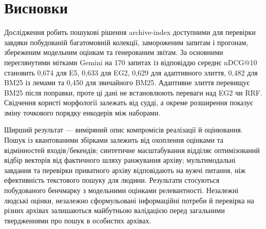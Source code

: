 \section{Висновки}\label{sec:conclusion}

Дослідження робить пошукові рішення archive-index доступними для перевірки завдяки побудованій багатомовній колекції, замороженим запитам і прогонам, збереженим модельним оцінкам та генерованим звітам. За основними переглянутими мітками Gemini на 170 запитах із відповіддю середнє nDCG@10 становить 0,674 для E5, 0,633 для EG2, 0,629 для адаптивного злиття, 0,482 для BM25 із лемами та 0,450 для звичайного BM25. Адаптивне злиття перевищує BM25 після поправки, проте ці дані не встановлюють переваги над EG2 чи RRF. Свідчення користі морфології залежать від судді, а окреме розширення показує зміну точкового порядку енкодерів між наборами.

Ширший результат --- виміряний опис компромісів реалізації й оцінювання. Пошук із квантованими збірками залежить від охоплення оцінками та відмінностей входів/бекендів; синтетичне масштабування відділяє оптимізований відбір векторів від фактичного шляху ранжування архіву; мультимодальні завдання та перевірки приватного архіву відповідають на вужчі питання, ніж ефективність текстового пошуку для людини. Результати стосуються побудованого бенчмарку з модельними оцінками релевантності. Незалежні людські оцінки, незалежно сформульовані інформаційні потреби й перевірка на різних архівах залишаються майбутньою валідацією перед загальними твердженнями про пошук в особистих архівах.
